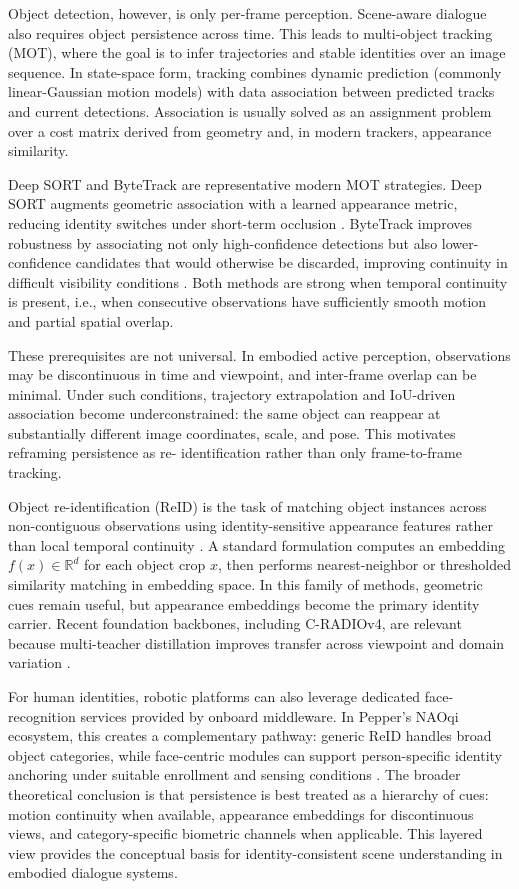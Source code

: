   Object detection, however, is only per-frame perception. Scene-aware dialogue also requires object persistence across time. This leads to multi-object tracking (MOT), where the goal is to infer
  trajectories and stable identities over an image sequence. In state-space form, tracking combines dynamic prediction (commonly linear-Gaussian motion models) with data association between predicted
  tracks and current detections. Association is usually solved as an assignment problem over a cost matrix derived from geometry and, in modern trackers, appearance similarity.

  Deep SORT and ByteTrack are representative modern MOT strategies. Deep SORT augments geometric association with a learned appearance metric, reducing identity switches under short-term occlusion
  \cite{wojke_simple_2017}. ByteTrack improves robustness by associating not only high-confidence detections but also lower-confidence candidates that would otherwise be discarded, improving continuity
  in difficult visibility conditions \cite{zhang_bytetrack_2022}. Both methods are strong when temporal continuity is present, i.e., when consecutive observations have sufficiently smooth motion and
  partial spatial overlap.

  These prerequisites are not universal. In embodied active perception, observations may be discontinuous in time and viewpoint, and inter-frame overlap can be minimal. Under such conditions, trajectory
  extrapolation and IoU-driven association become underconstrained: the same object can reappear at substantially different image coordinates, scale, and pose. This motivates reframing persistence as re-
  identification rather than only frame-to-frame tracking.

  Object re-identification (ReID) is the task of matching object instances across non-contiguous observations using identity-sensitive appearance features rather than local temporal continuity
  \cite{ye_transformer_2024}. A standard formulation computes an embedding \(f(x)\in\mathbb{R}^d\) for each object crop \(x\), then performs nearest-neighbor or thresholded similarity matching in
  embedding space. In this family of methods, geometric cues remain useful, but appearance embeddings become the primary identity carrier. Recent foundation backbones, including C-RADIOv4, are relevant
  because multi-teacher distillation improves transfer across viewpoint and domain variation \cite{ranzinger2026cradiov4techreport}.

  For human identities, robotic platforms can also leverage dedicated face-recognition services provided by onboard middleware. In Pepper’s NAOqi ecosystem, this creates a complementary pathway: generic
  ReID handles broad object categories, while face-centric modules can support person-specific identity anchoring under suitable enrollment and sensing conditions \cite{softbank_python_sdk_2026}. The
  broader theoretical conclusion is that persistence is best treated as a hierarchy of cues: motion continuity when available, appearance embeddings for discontinuous views, and category-specific
  biometric channels when applicable. This layered view provides the conceptual basis for identity-consistent scene understanding in embodied dialogue systems.


